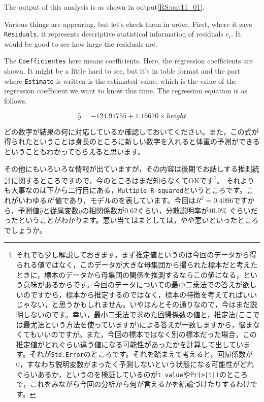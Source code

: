 \documentclass{ltjbook}
\begin{document}
The output of this analysis is as shown in output\ref{RS:out11_01}.



Various things are appearing, but let's check them in order. First, where it says \texttt{Residuals}, it represents descriptive statistical information of residuals $e_i$. It would be good to see how large the residuals are.

The \texttt{Coefficientes} here means coefficients. Here, the regression coefficients are shown. It might be a little hard to see, but it's in table format and the part where \texttt{Estimate} is written is the estimated value, which is the value of the regression coefficient we want to know this time.
The regression equation is as follows.

\[ \hat{y} = -124.91755 + 1.16670 \times height \]

どの数字が結果の何に対応しているか確認しておいてください。また，この式が得られたということは身長のところに新しい数字を入れると体重の予測ができるということもわかってもらえると思います。

その他にもいろいろな情報が出ていますが，その内容は後期でお話しする推測統計に関するところですので，今のところはまだ知らなくてOKです\footnote{それでも少し解説しておきます。まず推定値というのは今回のデータから得られる値ではなく，このデータが大きな母集団から撮られた標本だと考えたときに，標本のデータから母集団の関係を推測するならこの値になる，という意味があるからです。今回のデータについての最小二乗法での答えが欲しいのですから，標本から推定するのではなく，標本の特徴を考えてればいいじゃない，と思うかもしれません。いやほんとその通りなので，今はまだ説明しないのです。幸い，最小二乗法で求めた回帰係数の値と，推定法(ここでは最尤法という方法を使っていますが)による答えが一致しますから，悩まなくてもいいのですが。また，今回の標本ではなく別の標本だった場合，この推定値がどれぐらい違う値になる可能性があったかを計算して出しています。それが\texttt{Std.Error}のところです。それを踏まえて考えると，回帰係数が0，すなわち説明変数がまったく予測しないという状態になる可能性がどれぐらいあるか，というのを検証しているのが\texttt{t value}や\texttt{Pr(>|t|)}のところで，これをみながら今回の分析から何が言えるかを結論づけたりするわけです。}。
それよりも大事なのは下から二行目にある，\texttt{Multiple R-squared}というところです。これがいわゆる$R^2$値であり，モデルのを表しています。今回は$R^2=0.4096$ですから，予測値$\hat{y}$と従属変数$y$の相関係数が0.62ぐらい，分散説明率が40.9\% ぐらいだったということがわかります。悪い当てはまとしては，やや悪いといったところでしょうか。
\end{document}
